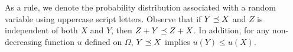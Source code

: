 


\newcommand{\gfA}{\gf{A}}
\newcommand{\gfD}{\gf{D}}
\newcommand{\gfL}{\gf{L}}
\newcommand{\gfLhat}{\gf{\hat{L}}}
\newcommand{\gfLtilde}{\gf{\tilde{L}}}
\newcommand{\gfE}{\gf{E}}
\newcommand{\gfEhat}{\gf{\hat{E}}}
\newcommand{\gfEcheck}{\gf{\check{E}}}
\newcommand{\gfF}{\gf{F}}
\newcommand{\gfFhat}{\gf{\hat{F}}}
\newcommand{\gfFcheck}{\gf{\check{F}}}
\newcommand{\gfEtilde}{\gf{\tilde{E}}}
\newcommand{\gfR}{\gf{R}}
\newcommand{\gfRhat}{\gf{\hat{R}}}
\newcommand{\gfRtilde}{\gf{\tilde{R}}}

\newcommand{\gfC}{\gf{C}}
\newcommand{\gfChat}{\gf{\hat{C}}}
\newcommand{\gfCcheck}{\gf{\check{C}}}
\newcommand{\gfCtilde}{\gf{\tilde{C}}}

\newcommand{\gfM}{\gf{M}}
\newcommand{\gfMhat}{\gf{\hat{M}}}
\newcommand{\gfMtilde}{\gf{\tilde{M}}}


\newcommand{\gfX}{\gf{X}}
\newcommand{\gfXinf}{\gf{X}_\infty}

\newcommand{\EventRCat}{E_\mathsf{right-cat}}
\newcommand{\EventReset}{E_\mathsf{reset}}

\newcommand{\SeqGF}{\longleftrightarrow}



As a rule, we denote the
probability distribution associated with a random variable using
uppercase script letters. 
Observe that if $Y \preceq X$ and 
$Z$ is independent of both $X$ and $Y$, 
then $Z + Y \preceq Z + X$. 
In addition, for any non-decreasing function $u$ defined on $\Omega$, 
$Y \preceq X$ implies $u(Y) \leq u(X)$.



